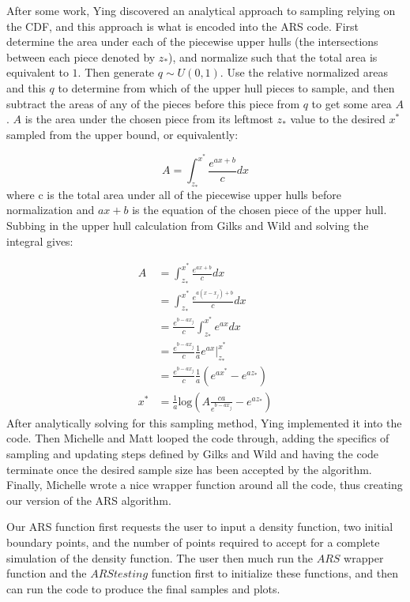 \documentclass{article}
\begin{document}
After some work, Ying discovered an analytical approach to sampling relying on the CDF, and this approach is what is encoded into the ARS code.  First determine the area under each of the piecewise upper hulls (the intersections between each piece denoted by $z_*$), and normalize such that the total area is equivalent to $1$.  Then generate $q\sim U\left(0, 1\right)$.  Use the relative normalized areas and this $q$ to determine from which of the upper hull pieces to sample, and then subtract the areas of any of the pieces before this piece from $q$ to get some area $A$.  $A$ is the area under the chosen piece from its leftmost $z_*$ value to the desired $x^*$ sampled from the upper bound, or equivalently:

$$A=\int_{z_*}^{x^*}\frac{e^{ax+b}}{c}dx$$
where c is the total area under all of the piecewise upper hulls before normalization and $ax+b$ is the equation of the chosen piece of the upper hull.  Subbing in the upper hull calculation from Gilks and Wild and solving the integral gives:

\begin{align*}
A &= \int_{z_*}^{x^*}\frac{e^{ax+b}}{c}dx\\
&= \int_{z_*}^{x^*}\frac{e^{a\left(x-x_j\right)+b}}{c}dx\\
&= \frac{e^{b-ax_j}}{c}\int_{z_*}^{x^*}e^{ax}dx\\
&= \frac{e^{b-ax_j}}{c}\frac{1}{a}\left.e^{ax}\right|_{z_*}^{x^*}\\
&= \frac{e^{b-ax_j}}{c}\frac{1}{a}\left(e^{ax^*} - e^{az_*}\right)\\
x^* &= \frac{1}{a}\text{log}\left(A\frac{ca}{e^{b-ax_j}}-e^{az_*}\right)
\end{align*}
After analytically solving for this sampling method, Ying implemented it into the code.  Then Michelle and Matt looped the code through, adding the specifics of sampling and updating steps defined by Gilks and Wild and having the code terminate once the desired sample size has been accepted by the algorithm.  Finally, Michelle wrote a nice wrapper function around all the code, thus creating our version of the ARS algorithm.

Our ARS function first requests the user to input a density function, two initial boundary points, and the number of points required to accept for a complete simulation of the density function. The user then much run the $ARS$ wrapper function and the $ARS testing$ function first to initialize these functions, and then can run the code to produce the final samples and plots. 
\end{document}
